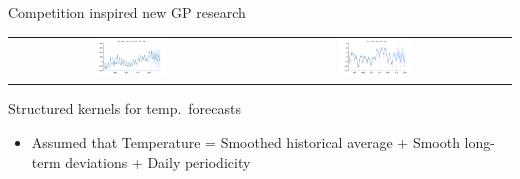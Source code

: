 \begin{frame}{Competition inspired new GP research}
\begin{tabular}{ccc}
\includegraphics[width=0.32\textwidth]{figures/monthly-canadian-total-unemploym/monthly-canadian-total-unemploym_all} & 
\includegraphics[width=0.32\textwidth]{figures/monthly-sales-of-us-houses-thous/monthly-sales-of-us-houses-thous_all}
  \end{tabular}
\end{frame}

\begin{frame}{Structured kernels for temp.\ forecasts}
  \begin{itemize}
    \item Assumed that Temperature = Smoothed historical average + Smooth long-term deviations + Daily periodicity
  \end{itemize}
  \begin{center}
    
  \end{center}
\end{frame}

